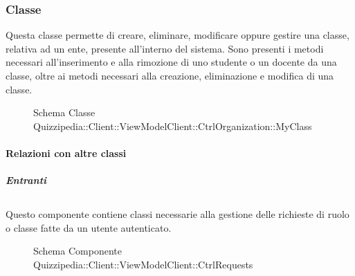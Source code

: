 \subsubsection{Classe }
Questa classe permette di creare, eliminare, modificare oppure gestire una classe, relativa ad un ente, presente all'interno del sistema.
Sono presenti i metodi necessari all'inserimento e alla rimozione di uno studente o un docente da una classe, oltre ai metodi necessari alla creazione, eliminazione e modifica di una classe.
\begin{figure}[H]
\centering
\noindent{}
\caption[Schema Classe MyClass]{Schema Classe Quizzipedia::Client::ViewModelClient::CtrlOrganization::MyClass}
\end{figure}
\paragraph{Relazioni con altre classi}
\subparagraph{Entranti}
\subsection{}
Questo componente contiene classi necessarie alla gestione delle richieste di ruolo o classe fatte da un utente autenticato.
\begin{figure}[H]
\centering
\noindent{}
\caption[Schema Componente Quizzipedia::Client::ViewModelClient::CtrlRequests]{Schema Componente Quizzipedia::Client::ViewModelClient::CtrlRequests}
\end{figure}
